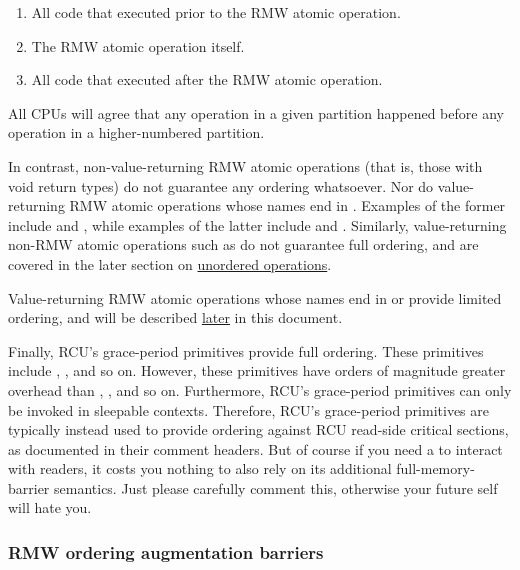 \begin{enumerate}
 \item	All code that executed prior to the RMW atomic operation.

 \item	The RMW atomic operation itself.

 \item	All code that executed after the RMW atomic operation.
\end{enumerate}

All CPUs will agree that any operation in a given partition happened
before any operation in a higher-numbered partition.

In contrast, non-value-returning RMW atomic operations (that is, those
with void return types) do not guarantee any ordering whatsoever.
Nor do value-returning RMW atomic operations whose names end in .
Examples of the former include  and ,
while examples of the latter include  and
.
Similarly, value-returning non-RMW atomic operations such as
 do not guarantee full ordering, and are covered in
the later section on
\hyperref[sec:docs:ordering:Unordered accesses]{unordered operations}.

Value-returning RMW atomic operations whose names end in  or
 provide limited ordering, and will be described
\hyperref[sec:docs:ordering:Ordered memory accesses]{later}
in this document.

Finally, RCU's grace-period primitives provide full ordering.
These primitives include , ,
 and so on.
However, these primitives have orders of magnitude greater overhead
than , , and so on.
Furthermore, RCU's grace-period primitives can only be invoked in
sleepable contexts.
Therefore, RCU's grace-period primitives are typically instead used to
provide ordering against RCU read-side critical sections, as documented
in their comment headers.
But of course if you need a  to interact with
readers, it costs you nothing to also rely on its additional
full-memory-barrier semantics.
Just please carefully comment this, otherwise your future self will hate you.


\subsubsection{RMW ordering augmentation barriers}
\label{sec:docs:ordering:RMW ordering augmentation barriers}


